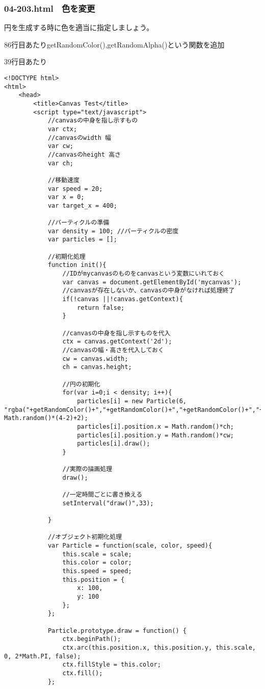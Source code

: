 \documentclass[mingoth,11pt,a4j,uplatex]{jsarticle}
\begin{document}
\subsubsection{04-203.html　色を変更}
円を生成する時に色を適当に指定しましょう。

86行目あたりgetRandomColor(),getRandomAlpha()という関数を追加

39行目あたり

\begin{lstlisting}[caption=色を変更]
<!DOCTYPE html>
<html>
	<head>
		<title>Canvas Test</title>
		<script type="text/javascript">
			//canvasの中身を指し示すもの
			var ctx;
			//canvasのwidth 幅
			var cw;
			//canvasのheight 高さ
			var ch;
			
			//移動速度
			var speed = 20;
			var x = 0;
			var target_x = 400;
			
			//パーティクルの準備
			var density = 100; //パーティクルの密度
			var particles = [];
			
			//初期化処理
			function init(){
				//IDがmycanvasのものをcanvasという変数にいれておく
				var canvas = document.getElementById('mycanvas');
				//canvasが存在しないか、canvasの中身がなければ処理終了
				if(!canvas ||!canvas.getContext){
					return false;
				}
				
				//canvasの中身を指し示すものを代入
				ctx = canvas.getContext('2d');
				//canvasの幅・高さを代入しておく
				cw = canvas.width;
				ch = canvas.height;
				
				//円の初期化
				for(var i=0;i < density; i++){
					particles[i] = new Particle(6, "rgba("+getRandomColor()+","+getRandomColor()+","+getRandomColor()+","+getRandomAlpha()+")", Math.random()*(4-2)+2);
					particles[i].position.x = Math.random()*ch;
					particles[i].position.y = Math.random()*cw;
					particles[i].draw();			
				}
				
				//実際の描画処理
				draw();
				
				//一定時間ごとに書き換える
				setInterval("draw()",33);

			}
			
			//オブジェクト初期化処理
			var Particle = function(scale, color, speed){
				this.scale = scale;
				this.color = color;
				this.speed = speed;
				this.position = {
					x: 100,
					y: 100
				};
			};
			
			Particle.prototype.draw = function() {
				ctx.beginPath();
				ctx.arc(this.position.x, this.position.y, this.scale, 0, 2*Math.PI, false);
				ctx.fillStyle = this.color;
				ctx.fill();
			};
			

\end{lstlisting}
\end{document}
